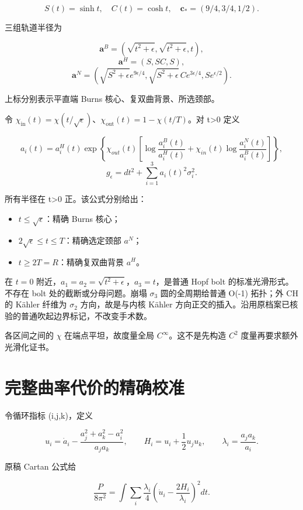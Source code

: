 \documentclass[UTF8,11pt,openany,fontset=none]{ctexbook}
\providecommand{\tightlist}{\setlength{\itemsep}{0pt}\setlength{\parskip}{0pt}}
\theoremstyle{definition}
\theoremstyle{remark}
\begin{document}
\[
S(t)=\sinh t,\quad C(t)=\cosh t,\quad
\mathbf c_*=(9/4,3/4,1/2).
\]

三组轨道半径为

\[
\mathbf a^B=(\sqrt{t^2+\epsilon},\sqrt{t^2+\epsilon},t),
\] \[
\mathbf a^H=(S,SC,S),
\] \[
\mathbf a^N=
\left(\sqrt{S^2+\epsilon}e^{9\epsilon/4},
\sqrt{S^2+\epsilon}\,C e^{3\epsilon/4},
S e^{\epsilon/2}\right).
\]

上标分别表示平直端 Burns 核心、复双曲背景、所选颈部。

令 \(\chi _{\mathrm{in}}(t)=\chi (t/\sqrt{\epsilon })\)、\(\chi _{\mathrm{out}}(t)=1-\chi (t/T)\)。对 t\textgreater0 定义

\[
 a_i(t)=a_i^H(t)\exp\left\{
 \chi_{out}(t)\left[
 \log\frac{a_i^B(t)}{a_i^H(t)}+
 \chi_{in}(t)\log\frac{a_i^N(t)}{a_i^B(t)}
 \right]\right\},
\] \[
 g_\epsilon=dt^2+\sum_{i=1}^3a_i(t)^2\sigma_i^2.
\tag{5.1.1}
\]

所有半径在 t\textgreater0 正。该公式分别给出：

\begin{itemize}
\tightlist
\item
  \(t\le \sqrt{\epsilon }\)：精确 Burns 核心；
\item
  \(2\sqrt{\epsilon }\le t\le T\)：精确选定颈部 \(a^N\)；
\item
  \(t\ge 2T=R\)：精确复双曲背景 \(a^H\)。
\end{itemize}

在 \(t=0\) 附近，\(a_1=a_2=\sqrt{t^2+\epsilon }\)，\(a_3=t\)，是普通 Hopf bolt 的标准光滑形式。不存在 bolt 处的截断或分母问题。崩塌 \(\sigma _3\) 圆的全周期给普通 O(-1) 拓扑；外 CH 的 Kähler 纤维为 \(\sigma _2\) 方向，故是与内核 Kähler 方向正交的插入。沿用原档案已核验的普通吹起边界标记，不改变手术数。

各区间之间的 \(\chi\) 在端点平坦，故度量全局 \(C^\infty\)。这不是先构造 \(C^2\) 度量再要求额外光滑化证书。

\section{完整曲率代价的精确校准}\label{v5-ux5b8cux6574ux66f2ux7387ux4ee3ux4ef7ux7684ux7cbeux786eux6821ux51c6}

令循环指标 (i,j,k)，定义

\[
 u_i=\dot a_i-\frac{a_j^2+a_k^2-a_i^2}{a_ja_k},\qquad
 H_i=u_i+\frac12u_ju_k,\qquad
 \lambda_i=\frac{a_ja_k}{a_i}.
\]

原稿 Cartan 公式给

\[
\frac{P}{8\pi^2}=\int\sum_i\frac{\lambda_i}{4}
 \left(\dot u_i-\frac{2H_i}{\lambda_i}\right)^2dt.
\tag{5.2.1}
\]
\end{document}
